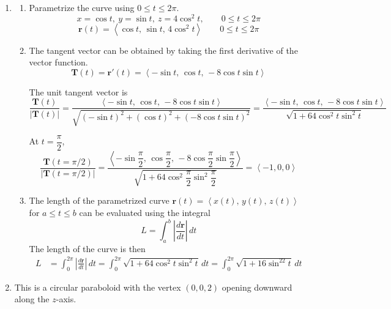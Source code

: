 \documentclass[a4paper, 12pt]{article}
\begin{document}
\begin{enumerate}[leftmargin=*,label=\textbf{\arabic*.}]
\begin{enumerate}[leftmargin=*,label=\textbf{\alph*.}]
\end{enumerate}

\item \begin{enumerate}[leftmargin=*,label=\textbf{\alph*.}]
\item Parametrize the curve using $0\leq t\leq 2\pi$.
\[x=\cos t,\:y=\sin t,\:z=4\cos^2t,\qquad0\leq t\leq2\pi\]
\[\boxed{\mathbf r(t)=\left\langle\cos t,\,\sin t,\,4\cos^2t\right\rangle\qquad0\leq t\leq2\pi}\]

\item The tangent vector can be obtained by taking the first derivative of the vector function.
\[\mathbf T(t)=\mathbf r'(t)=\left\langle-\sin t,\,\cos t,\,-8\cos t\sin t\right\rangle\]

The unit tangent vector is
\[\frac{\mathbf T(t)}{\left|\mathbf T(t)\right|}=\frac{\left\langle-\sin t,\,\cos t,\,-8\cos t\sin t\right\rangle}{\sqrt{(-\sin t)^2+(\cos t)^2+(-8\cos t\sin t)^2}}=\frac{\left\langle-\sin t,\,\cos t,\,-8\cos t\sin t\right\rangle}{\sqrt{1+64\cos^2t\sin^2t}}\]

At $t=\dfrac\pi2$,
\[\frac{\mathbf T(t=\pi/2)}{|\mathbf T(t=\pi/2)|}=\frac{\left\langle-\sin\dfrac\pi2,\,\cos \dfrac\pi2,\,-8\cos\dfrac\pi2\sin\dfrac\pi2\right\rangle}{\sqrt{1+64\cos^2\dfrac\pi2\sin^2\dfrac\pi2}}=\boxed{\left\langle-1,0,0\right\rangle}\]

\item The length of the parametrized curve $\mathbf{r}(t)=\left\langle x(t),\,y(t),\,z(t)\right\rangle$ for $a\leq t\leq b$ can be evaluated using the integral
\[L=\int_a^b\left|\frac{d\mathbf r}{dt}\right|\,dt\]
The length of the curve is then
\begin{align*}L&=\int_0^{2\pi}\left|\frac{d\mathbf r}{dt}\right|\,dt=\boxed{\int_0^{2\pi}\sqrt{1+64\cos^2t\sin^2t}\,dt=\int_0^{2\pi}\sqrt{1+16\sin^22t}\,dt}\end{align*}

\end{enumerate}
\newpage

\item This is a circular paraboloid with the vertex $(0,0,2)$ opening downward along the $z$-axis.

\begin{center}
\end{center}
\end{enumerate}
\end{document}
